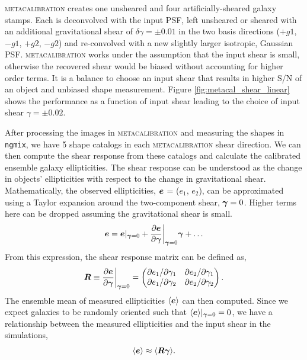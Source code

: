 \documentclass[fleqn,usenatbib]{mnras}
\begin{document}
\textsc{metacalibration} creates one unsheared and four artificially-sheared galaxy stamps. Each is deconvolved with the input PSF, left unsheared or sheared with an additional gravitational shear of $\delta\gamma=\pm 0.01$ in the two basis directions ($+g1$, $-g1$, $+g2$, $-g2$) and re-convolved with a new slightly larger isotropic, Gaussian PSF. \textsc{metacalibration} works under the assumption that the input shear is small, otherwise the recovered shear would be biased without accounting for higher order terms. It is a balance to choose an input shear that results in higher S/N of an object and unbiased shape measurement. Figure \ref{fig:metacal_shear_linear} shows the performance as a function of input shear leading to the choice of input shear $\gamma=\pm 0.02$. 

After processing the images in \textsc{metacalibration} and measuring the shapes in \texttt{ngmix}, we have 5 shape catalogs in each \textsc{metacalibration} shear direction. We can then compute the shear response from these catalogs and calculate the calibrated ensemble galaxy ellipticities. The shear response can be understood as the change in objects' ellipticities with respect to the change in gravitational shear. Mathematically, the observed ellipticities, $\vb*{e}$ = ($e_{1}$, $e_{2}$), can be approximated using a Taylor expansion around the two-component shear, $\vb*{\gamma}=0$. Higher terms here can be dropped assuming the gravitational shear is small. 
\begin{equation}
    \vb*{e} = \vb*{e}\rvert_{\vb*{\gamma}=0} + \frac{\partial \vb*{e}}{\partial \vb*{\gamma}}\bigg\rvert_{\vb*{\gamma}=0}\vb*{\gamma} + \ldots
\end{equation}
From this expression, the shear response matrix can be defined as, 
\begin{equation}
    \vb*{R} \equiv \frac{\partial \vb*{e}}{\partial \vb*{\gamma}}\bigg\rvert_{\vb*{\gamma}=0} = 
    \begin{pmatrix}
        \partial e_{1}/\partial \gamma_{1} & \partial e_{2}/\partial \gamma_{1} \\ 
        \partial e_{1}/\partial \gamma_{2} & \partial e_{2}/\partial \gamma_{2}
    \end{pmatrix}. 
\end{equation}
The ensemble mean of measured ellipticities $\langle\vb*{e}\rangle$ can then computed. Since we expect galaxies to be randomly oriented such that $\langle\vb*{e}\rangle\rvert_{\vb*{\gamma}=0}=0$, we have a relationship between the measured ellipticities and the input shear in the simulations, 
\begin{equation}
    \langle\vb*{e}\rangle \approx \langle \vb*{R}\vb*{\gamma} \rangle. 
\end{equation} 
\end{document}
